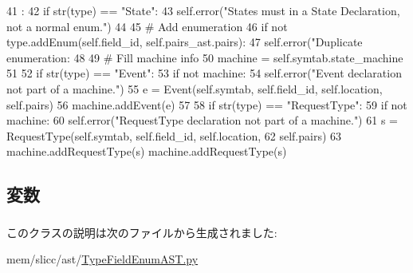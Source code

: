 \begin{DoxyCode}
41                             :
42         if str(type) == "State":
43             self.error("States must in a State Declaration, not a normal enum.")
44         
45         # Add enumeration
46         if not type.addEnum(self.field_id, self.pairs_ast.pairs):
47             self.error("Duplicate enumeration: %
48 
49         # Fill machine info
50         machine = self.symtab.state_machine
51 
52         if str(type) == "Event":
53             if not machine:
54                 self.error("Event declaration not part of a machine.")
55             e = Event(self.symtab, self.field_id, self.location, self.pairs)
56             machine.addEvent(e)
57 
58         if str(type) == "RequestType":
59             if not machine:
60                 self.error("RequestType declaration not part of a machine.")
61             s = RequestType(self.symtab, self.field_id, self.location,
62                            self.pairs)
63             machine.addRequestType(s)
            machine.addRequestType(s)
\end{DoxyCode}


\subsection{変数}
\hypertarget{classslicc_1_1ast_1_1TypeFieldEnumAST_1_1TypeFieldEnumAST_a34ced61a2f2477f2d7a1279dac84ae9b}{
\subsubsection[{field\_\-id}]{}}
\label{classslicc_1_1ast_1_1TypeFieldEnumAST_1_1TypeFieldEnumAST_a34ced61a2f2477f2d7a1279dac84ae9b}
\hypertarget{classslicc_1_1ast_1_1TypeFieldEnumAST_1_1TypeFieldEnumAST_a03baf6f181cc885912d671c3fcbfd7e3}{
\subsubsection[{pairs\_\-ast}]{}}
\label{classslicc_1_1ast_1_1TypeFieldEnumAST_1_1TypeFieldEnumAST_a03baf6f181cc885912d671c3fcbfd7e3}


このクラスの説明は次のファイルから生成されました:\begin{DoxyCompactItemize}
\item 
mem/slicc/ast/\hyperlink{TypeFieldEnumAST_8py}{TypeFieldEnumAST.py}\end{DoxyCompactItemize}
